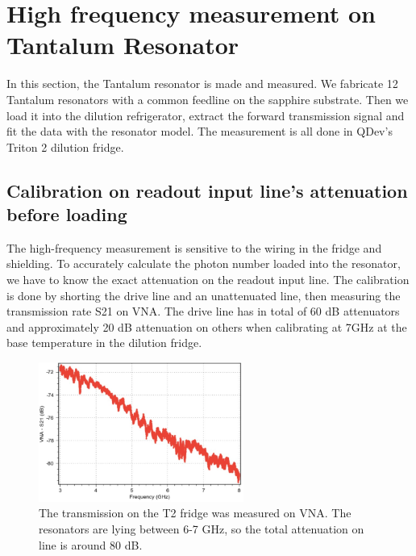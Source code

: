 \clearpage
\section{High frequency measurement on Tantalum Resonator}

In this section, the Tantalum resonator is made and measured. We fabricate 12 Tantalum resonators with a common feedline on the sapphire substrate. Then we load it into the dilution refrigerator, extract the forward transmission signal and fit the data with the resonator model. The measurement is all done in QDev's Triton 2 dilution fridge.

\subsection{Calibration on readout input line's attenuation before loading}

The high-frequency measurement is sensitive to the wiring in the fridge and shielding. To accurately calculate the photon number loaded into the resonator, we have to know the exact attenuation on the readout input line. The calibration is done by shorting the drive line and an unattenuated line, then measuring the transmission rate S21 on VNA. The drive line has in total of 60 dB attenuators and approximately 20 dB attenuation on others when calibrating at 7GHz at the base temperature in the dilution fridge.
\begin{figure}[h!]
    \centering
    \includegraphics[width=0.6\textwidth]{Pic/Cali_res.jpg}
    \caption{The transmission on the T2 fridge was measured on VNA. The resonators are lying between 6-7 GHz, so the total attenuation on line is around 80 dB.}
    \label{fig:my_label}
\end{figure}


